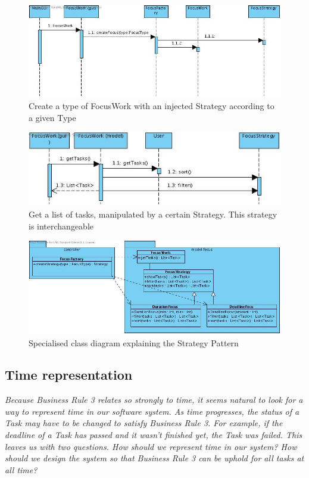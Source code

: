 {		\begin{figure}[H]
			\begin{center}
				\includegraphics[scale=0.5]{images/FocusFactory.jpg}
			\end{center}
			\caption{Create a type of FocusWork with an injected Strategy according to a given Type}
		\end{figure}
		\begin{figure}[H]
			\begin{center}
				\includegraphics[scale=0.5]{images/FocusStrategy.jpg}
			\end{center}
			\caption{Get a list of tasks, manipulated by a certain Strategy. This strategy is interchangeable}
		\end{figure}
		\begin{figure}[H]
			\begin{center}
				\includegraphics[scale=0.5]{images/focus_class_diagram.jpg}
			\end{center}
			\caption{Specialised class diagram explaining the Strategy Pattern}
		\end{figure}
		}
		\subsection{Time representation}
		\emph{
		Because Business Rule 3 relates so strongly to time, it seems natural to look for a way to represent time in our software system. As time progresses, the status of a Task may have to be changed to satisfy Business Rule 3. For example, if the deadline of a Task has passed and it wasn't finished yet, the Task was failed. This leaves us with two questions. How should we represent time in our system? How should we design the system so that Business Rule 3 can be uphold for all tasks at all time?}
		
